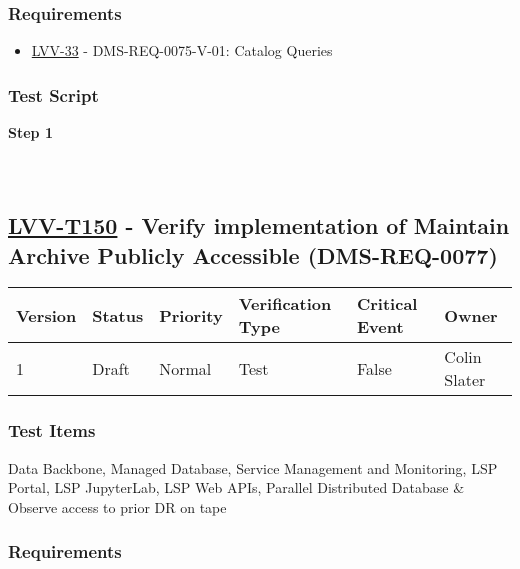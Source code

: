 \hypertarget{requirements-49}{%
\subsubsection{Requirements}\label{requirements-49}}

\begin{itemize}
\tightlist
\item
  \href{https://jira.lsstcorp.org/browse/LVV-33}{LVV-33} -
  DMS-REQ-0075-V-01: Catalog Queries
\end{itemize}

\hypertarget{test-script-49}{%
\subsubsection{Test Script}\label{test-script-49}}

\textbf{Step 1}\\
~\\
~\\

\hypertarget{lvv-t150---verify-implementation-of-maintain-archive-publicly-accessible-dms-req-0077}{%
\subsection{\texorpdfstring{\href{https://jira.lsstcorp.org/secure/Tests.jspa\#/testCase/LVV-T150}{LVV-T150}
- Verify implementation of Maintain Archive Publicly Accessible
(DMS-REQ-0077)}{LVV-T150 - Verify implementation of Maintain Archive Publicly Accessible (DMS-REQ-0077)}}\label{lvv-t150---verify-implementation-of-maintain-archive-publicly-accessible-dms-req-0077}}

\begin{longtable}[]{@{}llllll@{}}
\toprule
Version & Status & Priority & Verification Type & Critical Event &
Owner\tabularnewline
\midrule
\endhead
1 & Draft & Normal & Test & False & Colin Slater\tabularnewline
\bottomrule
\end{longtable}

\hypertarget{test-items-50}{%
\subsubsection{Test Items}\label{test-items-50}}

Data Backbone, Managed Database, Service Management and Monitoring, LSP
Portal, LSP JupyterLab, LSP Web APIs, Parallel Distributed Database \&
Observe access to prior DR on tape

\hypertarget{requirements-50}{%
\subsubsection{Requirements}\label{requirements-50}}

